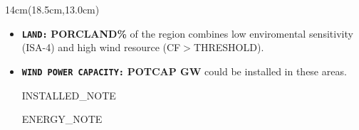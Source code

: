 \documentclass{article}
\begin{document}
\begin{textblock*}{14cm}(18.5cm,13.0cm)
\begin{tcolorbox}[colback=background,colframe=black,boxrule=0.5pt,arc=5pt,left=0pt,right=15pt,top=15pt,bottom=15pt]
\large
    \begin{itemize}
        \item \texttt{\textbf{LAND:}} {\color{low}\textbf{PORCLAND\%}} of the region combines low enviromental sensitivity (ISA-4) and high wind resource (CF$>$THRESHOLD). \vspace{0.4cm}
        
        \item \texttt{\textbf{WIND POWER CAPACITY:}} {\color{low}\textbf{POTCAP GW}} could be installed in these areas.

            INSTALLED_NOTE

        ENERGY_NOTE
    \end{itemize}
\end{tcolorbox}
\end{textblock*}
\end{document}
